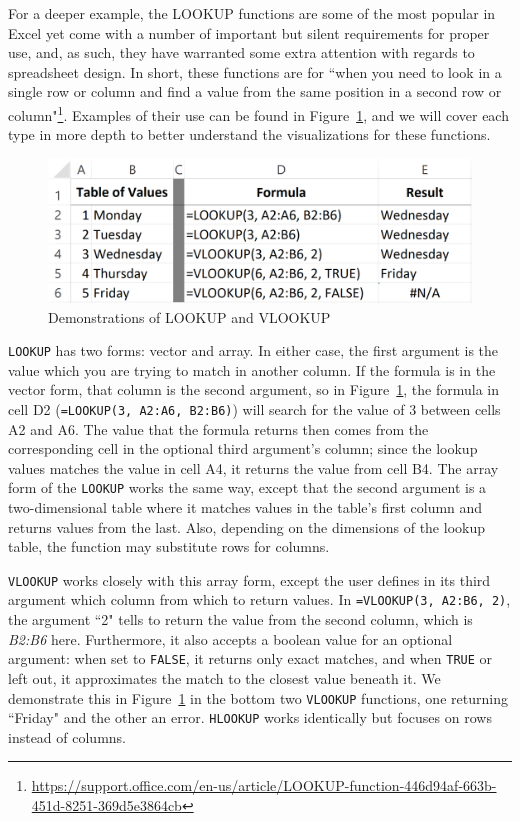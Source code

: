\documentclass[conference]{IEEEtran}
\begin{document}
	For a deeper example, the LOOKUP functions are some of the most popular in
	Excel yet come with a number of important but silent requirements for proper
	use, and, as such, they have warranted some extra attention with regards to
	spreadsheet design. In short, these functions are for ``when you need to look
	in a single row or column and find a value from the same position in a second
	row or
	column"\footnote{\href{https://support.office.com/en-us/article/LOOKUP-function-446d94af-663b-451d-8251-369d5e3864cb}{https://support.office.com/en-us/article/LOOKUP-function-446d94af-663b-451d-8251-369d5e3864cb}}. Examples of their use can be found in Figure~\ref{fig:lookupexample}, and we will cover each type in more depth to better understand the visualizations for these functions.
	
	\begin{figure}[h] \centering
		\includegraphics[width=.5\textwidth]{lookupexample} \caption{Demonstrations of
			LOOKUP and VLOOKUP} \label{fig:lookupexample} \end{figure}
	
	\texttt{LOOKUP} has two forms: vector and array. In either case, the first argument is
	the value which you are trying to match in another column. If the formula is in
	the vector form, that column is the second argument, so in
	Figure~\ref{fig:lookupexample}, the formula in cell D2 (\texttt{=LOOKUP(3,
		A2:A6, B2:B6)}) will search for the value of 3 between cells A2 and A6. The
	value that the formula returns then comes from the corresponding cell in the
	optional third argument's column; since the lookup values matches the value in
	cell A4, it returns the value from cell B4. The array form of the \texttt{LOOKUP} works
	the same way, except that the second argument is a two-dimensional table where
	it matches values in the table's first column and returns values from the last.
	Also, depending on the dimensions of the lookup table, the function may
	substitute rows for columns.
	
	\texttt{VLOOKUP} works closely with this array form, except the user defines in its
	third argument which column from which to return values. In \texttt{=VLOOKUP(3,
		A2:B6, 2)}, the argument ``2" tells to return the value from the second column,
	which is \textit{B2:B6} here. Furthermore, it also accepts a boolean value for
	an optional argument: when set to \texttt{FALSE}, it returns only exact matches, and
	when \texttt{TRUE} or left out, it approximates the match to the closest value beneath
	it. We demonstrate this in Figure~\ref{fig:lookupexample} in the bottom two
	\texttt{VLOOKUP} functions, one returning ``Friday" and the other an error. \texttt{HLOOKUP}
	works identically but focuses on rows instead of columns.
	
\end{document}
